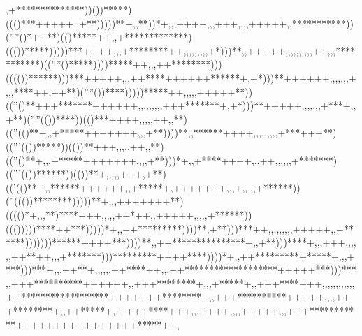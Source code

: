            ,+**************))())*****)((()***+++++,                        ,+**)))))**+,             ,**))*+,,,++++,,                            ,+++,,              ,,+++++,                              ,***********))(''''()*++**)(()*****++,,                          +*************)((())*****)))))***++++,,                         ,+********++,,,,,,,,,    +*)))**,,+++++,                            ,,,,,                 ,,,,++,,                             ,***********)((''''()*****))))*****++,,                          ,++********)))(((())******)))***+++++,                          ,,++****++++++******+,   +*)))**++++++,,                            ,,,                      ,,+,,                             ,****++,++**)(''''())****)))))*****++,,,                           ,,+++++**))((''()**+++*******++++++,                            ,,,,,,,,+++*******+,   +*)))**+++++,,                                                       ,,,,                             ,+***+,,+**)(''''(())****))(()***++++,,,                            ,,++,,**)((''(()**+,,+*****+++++++,                                    ,,+**))))**,   ,******++++,,                                        ,,,              ,,,                             ,+***+++**)(('''(())*****))(())**+++,,,                             ,,++,,**)((''()**+,,,+*****+++++++,,                                    ,,+**)))*+,   ,+****++++,,                                         ,++,            ,,,,                             ,+*******)(('''(())******))(())**+,,,                              ,,+++,+**)(('(()**+,  ,******++++++,                                       ,+*****+    ,+++++++,,                                           ,+,             ,,,                              ,+******))(''((())********)))))**+,                              ,,+++++++**)(((()*+,,   ,**)****+++,,,                                       ,,++*++,     ,+++++,,                                             ,               ,                               ,+******))((()))))****++***)))))*+,                              ,++*********))))**,     +**)))***++,                                 ,,       ,,,,,       ,+++++,                                                                                              ,+******)))))))******++++***))))**,                             ,++***************+,    ,+**)))****+,                               ,,+++,    ,,,,         ,++**++,,                                                                                            ,+*******)))*********++++****))))*+,                            ,++*********+*****+,   ,,+***)))***+,                              ,,++**+,    ,,,       ,,++****++,,                                                                                          ,++*******************+++++***)))***,                           ,+++**********++++++,   ,+++********+,                             ,,+*****+     ,        ,+++****+++,                               ,,,,                      ,,,,,,                           ,++******************+++++++********+,                          ,+++**********+++++,,  ,,+++********+,                             ,++*****+,            ,++++****+++,,                             ,++++,,                  ,,+++++,,                         ,+++***********++++++++++++++++*****++,                       